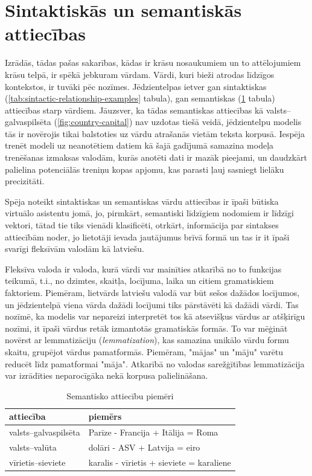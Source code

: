 \section{Sintaktiskās un semantiskās attiecības}

Izrādās, tādas pašas sakarības, kādas ir krāsu nosaukumiem un to attēlojumiem krāsu telpā, ir spēkā jebkuram vārdam. Vārdi, kuri bieži atrodas līdzīgos kontekstos, ir tuvāki pēc nozīmes. Jēdzientelpas ietver gan sintaktiskas (\ref{tab:sintactic-relationship-examples} tabula), gan semantiskas (\ref{tab:semantic-relationship-examples} tabula) attiecības starp vārdiem. Jāuzsver, ka tādas semantiskas attiecības kā valsts--galvaspilsēta (\ref{fig:country-capital}) nav uzdotas tiešā veidā, jēdzientelpu modelis tās ir novērojis tikai balstoties uz vārdu atrašanās vietām teksta korpusā. Iespēja trenēt modeli uz neanotētiem datiem kā šajā gadījumā samazina modeļa trenēšanas izmaksas valodām, kurās anotēti dati ir mazāk pieejami, un daudzkārt palielina potenciālās treniņu kopas apjomu, kas parasti ļauj sasniegt lielāku precizitāti.

Spēja noteikt sintaktiskas un semantiskas vārdu attiecības ir īpaši būtiska virtuālo asistentu jomā, jo, pirmkārt, semantiski līdzīgiem nodomiem ir līdzīgi vektori, tātad tie tiks vienādi klasificēti, otrkārt, informācija par sintakses attiecībām noder, jo lietotāji ievada jautājumus brīvā formā un tas ir it īpaši svarīgi fleksīvām valodām kā latviešu.

Fleksīva valoda ir valoda, kurā vārdi var mainīties atkarībā no to funkcijas teikumā, t.i., no dzimtes, skaitļa, locījuma, laika un citiem gramatiskiem faktoriem. Piemēram, lietvārds latviešu valodā var būt sešos dažādos locījumos, un jēdzientelpā viena vārda dažādi locījumi tiks pārstāvēti kā dažādi vārdi. Tas nozīmē, ka modelis var nepareizi interpretēt tos kā atsevišķus vārdus ar atšķirīgu nozīmi, it īpaši vārdus retāk izmantotās gramatiskās formās. To var mēģināt novērst ar lemmatizāciju (\textit{lemmatization}), kas samazina unikālo vārdu formu skaitu, grupējot vārdus pamatformās. Piemēram, "mājas" un "māju" varētu reducēt līdz pamatformai "māja". Atkarībā no valodas sarežģītības lemmatizācija var izrādīties neparocīgāka nekā korpusa palielināšana.


\begin{table}[htbp]
	\centering
	\caption{Semantisko attiecību piemēri \cite{word2vec2013}}
	\begin{tabular}{ll}\toprule
		attiecība & piemērs  \\\midrule
		valsts--galvaspilsēta   & Parīze - Francija + Itālija = Roma \\
		valsts--valūta   & dolāri - ASV + Latvija = eiro \\
		vīrietis--sieviete   & karalis - vīrietis + sieviete = karaliene \\\bottomrule
	\end{tabular}%
	\label{tab:semantic-relationship-examples}%
\end{table}

